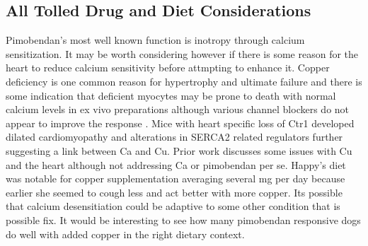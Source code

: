 \subsection{ All Tolled Drug and Diet  Considerations } 
Pimobendan's most well known function is inotropy through 
calcium sensitization. It may be worth considering however if there
is some reason for the heart to reduce calcium sensitivity before
attmpting to enhance it.  Copper deficiency is one common reason
for hypertrophy and ultimate failure and there is some indication
that deficient myocytes may be prone to death with normal calcium levels
in ex vivo preparations although various channel blockers do not appear
to improve the response 
\cite{PROHASKA19991842}. 
Mice with heart specific loss of Ctr1 developed dilated cardiomyopathy
and alterations in SERCA2 related regulators 
\cite{Kim_Turski_Nose_Cardiac_Copper_Deficiency_Activates_2010}
further suggesting a link between Ca and Cu.
Prior work discusses some issues with Cu and the heart
\cite{marchywka-MJM-2024-010-0.01rg}
although not addressing Ca or pimobendan per se.
Happy's diet was notable for copper supplementation
averaging several mg per day because earlier she seemed to cough less
and act better with more copper.  Its possible that calcium desensitiation
could be adaptive to some other condition that is possible fix.  
It would be interesting to see how many pimobendan responsive dogs
do well with added copper in the right dietary context.  


